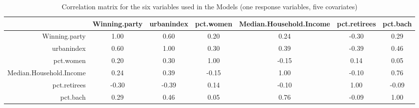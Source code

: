 \documentclass[12pt]{article}
\begin{document}
\begin{table}[h]
	\centering
	\caption{Correlation matrix for the six variables used in the Models (one response variables, five covariates)}
	\label{}
	\begin{adjustbox}{max width=\textwidth}
	\begin{tabular}{rcccccc}
		\hline
		& Winning.party & urbanindex & pct.women & Median.Household.Income & pct.retirees & pct.bach \\ 
		\hline
		Winning.party & 1.00 & 0.60 & 0.20 & 0.24 & -0.30 & 0.29 \\ 
		urbanindex & 0.60 & 1.00 & 0.30 & 0.39 & -0.39 & 0.46 \\ 
		pct.women & 0.20 & 0.30 & 1.00 & -0.15 & 0.14 & 0.05 \\ 
		Median.Household.Income & 0.24 & 0.39 & -0.15 & 1.00 & -0.10 & 0.76 \\ 
		pct.retirees & -0.30 & -0.39 & 0.14 & -0.10 & 1.00 & -0.09 \\ 
		pct.bach & 0.29 & 0.46 & 0.05 & 0.76 & -0.09 & 1.00 \\ 
		\hline
	\end{tabular}
	\end{adjustbox}
\end{table}

\end{document}
